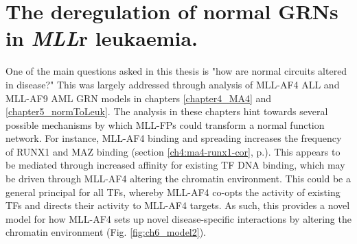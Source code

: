 
\section{The deregulation of normal GRNs in \textit{MLL}r leukaemia.}

One of the main questions asked in this thesis is "how are normal circuits altered in disease?" This was largely addressed through analysis of MLL-AF4 ALL and MLL-AF9 AML GRN models in chapters \ref{chapter4_MA4} and \ref{chapter5_normToLeuk}. The analysis in these chapters hint towards several possible mechanisms by which MLL-FPs could transform a normal function network. For instance, MLL-AF4 binding and spreading increases the frequency of RUNX1 and MAZ binding (section \ref{ch4:ma4-runx1-cor}, p.\pageref{ch4:ma4-runx1-cor}). This appears to be mediated through increased affinity for existing TF DNA binding, which may be driven through MLL-AF4 altering the chromatin environment. This could be a general principal for all TFs, whereby MLL-AF4 co-opts the activity of existing TFs and directs their activity to MLL-AF4 targets. As such, this provides a novel model for how MLL-AF4 sets up novel disease-specific interactions by altering the chromatin environment (Fig. \ref{fig:ch6_model2}).

